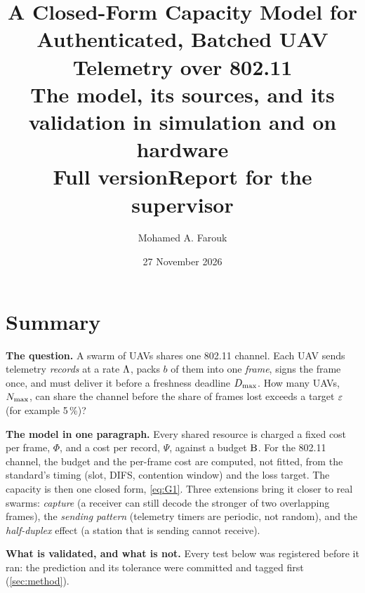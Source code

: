 \documentclass[11pt,a4paper]{article}
\title{\textbf{A Closed-Form Capacity Model for Authenticated, Batched UAV Telemetry over 802.11}\\[0.4em]
\large The model, its sources, and its validation in simulation and on hardware\\[0.2em]
\normalsize\iffull Full version\else Report for the supervisor\fi}
\author{Mohamed A. Farouk}
\date{27 November 2026}
\newif\iffull
\begin{document}
\maketitle

\iffull\tableofcontents\newpage\fi

\section{Summary}

\textbf{The question.} A swarm of UAVs shares one 802.11 channel. Each UAV sends telemetry
\emph{records} at a rate $\Lambda$, packs $b$ of them into one \emph{frame}, signs the frame once, and
must deliver it before a freshness deadline $D_{\max}$. How many UAVs, $N_{\max}$, can share the channel
before the share of frames lost exceeds a target $\varepsilon$ (for example 5\,\%)?

\textbf{The model in one paragraph.} Every shared resource is charged a fixed cost per frame, $\Phi$,
and a cost per record, $\Psi$, against a budget $\mathrm{B}$. For the 802.11 channel, the budget and the
per-frame cost are computed, not fitted, from the standard's timing (slot, DIFS, contention window)
and the loss target. The capacity is then one closed form, \eqref{eq:G1}. Three extensions bring it
closer to real swarms: \emph{capture} (a receiver can still decode the stronger of two overlapping
frames), the \emph{sending pattern} (telemetry timers are periodic, not random), and the
\emph{half-duplex} effect (a station that is sending cannot receive).

\textbf{What is validated, and what is not.} Every test below was registered before it ran: the
prediction and its tolerance were committed and tagged first (\cref{sec:method}).
\end{document}
